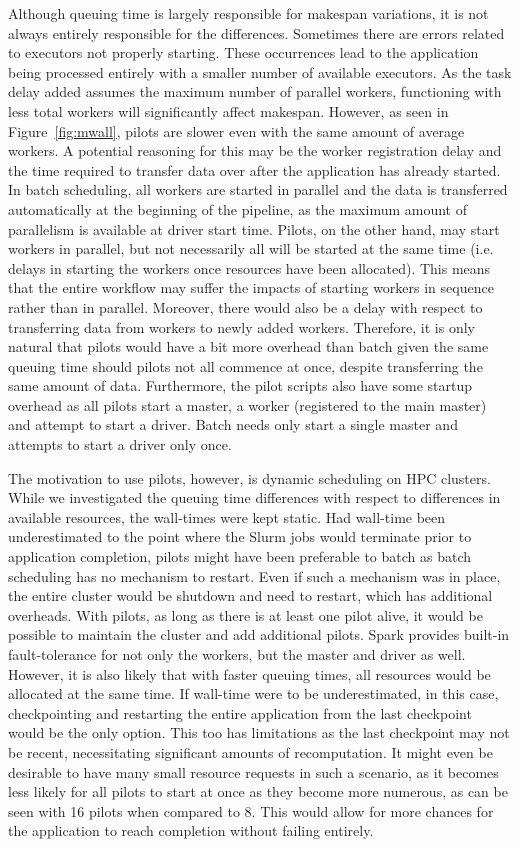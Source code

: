 \documentclass{IEEEtran}
\begin{document}
Although queuing time is largely responsible for makespan variations, it is not
always entirely responsible for the differences. Sometimes there are errors related
to executors not properly starting. These occurrences lead to the 
application being processed entirely with a smaller number of available executors. As the task
delay added assumes the maximum number of parallel workers, functioning with less total workers
will significantly affect makespan. However, as seen in Figure~\ref{fig:mwall},
pilots are slower even with the same amount of average workers. A potential reasoning for this
may be the worker registration delay and the time required to transfer data
over after the application has already started. In batch scheduling, all workers are started in
parallel and the data is transferred automatically at the beginning of the pipeline, as the maximum amount
of parallelism is available at driver start time. Pilots, on the other hand, may start workers in parallel,
but not necessarily all will be started at the same time (i.e. delays in starting the workers once resources
have been allocated). This means that the entire 
workflow may suffer the impacts of starting workers in sequence rather than in parallel. Moreover, there would also
be a delay with respect to transferring data from workers to newly added workers. Therefore,
it is only natural that pilots would have a bit more overhead than batch given the same
queuing time should pilots not all commence at once, despite transferring the same amount of data.
 Furthermore, the pilot scripts also
have some startup overhead as all pilots start a master, a worker (registered to the main
master) and attempt to start a driver. Batch needs only start a single master and attempts to start
a driver only once.

The motivation to use pilots, however, is dynamic scheduling on HPC clusters. While we
investigated the queuing time differences with respect to differences in available resources,
the wall-times were kept static. Had wall-time been underestimated to the point where the Slurm jobs
would terminate prior to application completion, pilots might have been preferable to batch
as batch scheduling has no mechanism to restart. Even if such a mechanism was in place, the entire
cluster would be shutdown and need to restart, which has additional overheads. With pilots, as long as 
there is at least one pilot alive, it would be possible to maintain the cluster and add additional pilots.
Spark provides built-in fault-tolerance for not only the workers, but the master and driver as well. However,
it is also likely that with faster queuing times, all resources would be allocated at the same time. If wall-time
were to be underestimated, in this case, checkpointing and restarting the entire application from the last
checkpoint would be the only option. This too has limitations as the last checkpoint may not be recent,
necessitating significant amounts of recomputation. It
might even be desirable to have many small resource requests in such a scenario, as it becomes less likely for all pilots to start at once as they become more numerous, as can be seen with 16 pilots when compared to 8. This would allow
for more chances for the application to reach completion without failing entirely.
\end{document}
